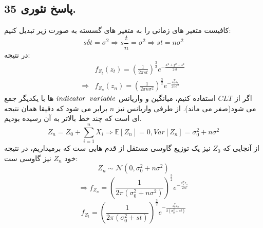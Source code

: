 \documentclass[]{article}
\begin{document}
\subsection{پاسخ تئوری 35.}
کافیست متغیر های زمانی را به متغیر های گسسته به صورت زیر تبدیل کنیم:
\begin{equation}
	\nonumber
	s\delta t = \sigma^2 \Rightarrow s\frac{t}{n} = \sigma^2 \Rightarrow st = n\sigma^2 
\end{equation}
در نتیجه:
\begin{equation}
	\nonumber
	\begin{split}
		&f_{Z_t}(z_t) = (\frac{1}{2\pi st})^{\frac{3}{2}} e^{-\frac{x^2 + y^2 + z^2}{2st}}\\
		\Rightarrow&f_{Z_n}(z_n) = (\frac{1}{2\pi n\sigma^2})^{\frac{3}{2}} e^{-\frac{z_n^T z_n}{2n\sigma^2}}
	\end{split}
\end{equation}
اگر از 
$CLT$
استفاده کنیم، میانگین و واریانس
$indicator \hspace{0.2cm}variable$
ها با یکدیگر جمع می شود(صفر می ماند). از طرفی واریانس نیز 
$n$
برابر می شود که دقیقا همان نتیجه ای است که چند خط بالاتر به آن رسیده بودیم.
\begin{equation}
	\nonumber
	Z_n = Z_0 + \sum_{i=1}^{n} X_i \Rightarrow \mathbb{E}[Z_n] = 0 , Var[Z_n] = \sigma_0^2 + n\sigma^2
\end{equation}
از آنجایی که 
$Z_0$
نیز یک توزیع گاوسی مستقل از قدم هایی ست که برمیداریم، در نتیجه خود 
$Z_n$
نیز گاوسی ست:
\begin{equation}
	\nonumber
	Z_n \sim \mathcal{N}(0, \sigma_0^2 + n\sigma^2)
\end{equation}
\begin{equation}
	\nonumber
	\Rightarrow f_{Z_n} = (\frac{1}{2\pi(\sigma_0^2 + n\sigma^2)})^{\frac{3}{2}} e^{-\frac{z_n^T z_n}{2st}}
\end{equation}
\begin{equation}
	\nonumber
	f_{Z_t} = (\frac{1}{2\pi (\sigma_0^2 + st)})^{\frac{3}{2}} e^{-\frac{z_n^T z_n}{2(\sigma_0^2 + st)}}
\end{equation}
\newpage
\end{document}

